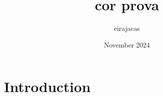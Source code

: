 \documentclass{article}
\title{cor prova}
\author{eirajacas }
\date{November 2024}
\begin{document}
\maketitle

\section{Introduction}
\end{document}
